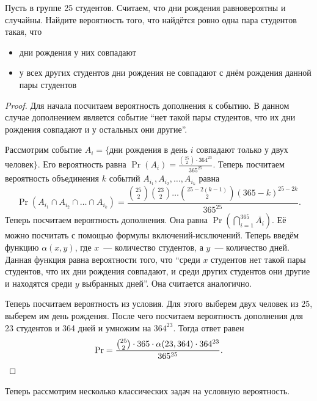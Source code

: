 \begin{problem}
    Пусть в группе 25 студентов. Считаем, что дни рождения равновероятны и случайны. Найдите вероятность того, что найдётся ровно одна пара студентов такая, что
    \begin{itemize}
        \item дни рождения у них совпадают
        \item у всех других студентов дни рождения не совпадают с днём рождения данной пары студентов
    \end{itemize}
\end{problem}
\begin{proof}
    Для начала посчитаем вероятность дополнения к событию. В данном случае дополнением является событие ``нет такой пары студентов, что их дни рождения совпадают и у остальных они другие''.
    
    Рассмотрим событие \(A_i = \{\)дни рождения в день \(i\) совпадают только у двух человек\(\}\). Его вероятность равна \(\Pr(A_{i}) = \frac{\binom{25}{2}\cdot 364^{23}}{365^{25}}\). Теперь посчитаем вероятность объединения \(k\) событий \(A_{i_1}, A_{i_2}, \ldots, A_{i_k}\) равна \[\Pr(A_{i_1} \cap A_{i_2} \cap \ldots \cap A_{i_k}) = \frac{\binom{25}{2}\binom{23}{2} \ldots \binom{25 - 2(k - 1)}{2}(365 - k)^{25 - 2k}}{365^{25}}.\]
    Теперь посчитаем вероятность дополнения. Она равна \(\Pr\left(\bigcap\limits_{i = 1}^{365} \overline{A_i}\right)\). Её можно посчитать с помощью формулы включений-исключений. Теперь введём функцию \(\alpha(x, y)\), где \(x\)~--- количество студентов, а \(y\)~--- количество дней. Данная функция равна вероятности того, что ``среди \(x\) студентов нет такой пары студентов, что их дни рождения совпадают, и среди других студентов они другие и находятся среди \(y\) выбранных дней''. Она считается аналогично.
    
    Теперь посчитаем вероятность из условия. Для этого выберем двух человек из 25, выберем им день рождения. После чего посчитаем вероятность дополнения для 23 студентов и 364 дней и умножим на \(364^{23}\). Тогда ответ равен 
    \[\Pr = \frac{\binom{25}{2} \cdot 365 \cdot \alpha(23, 364) \cdot 364^{23}}{365^{25}}.\qedhere\]
\end{proof}

Теперь рассмотрим несколько классических задач на условную вероятность.

